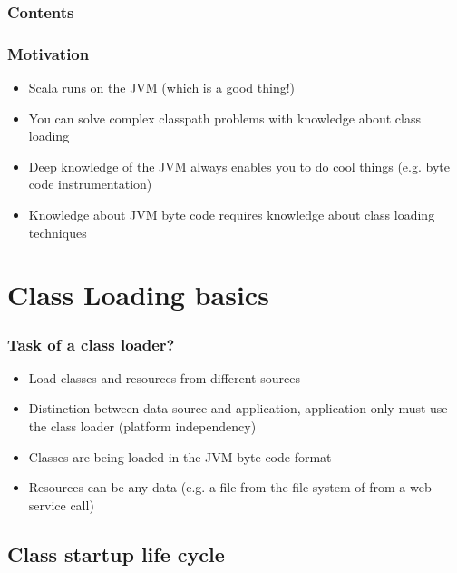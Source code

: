 \documentclass[aspectratio=169]{beamer}
\begin{document}
\begin{frame}
	\frametitle{Contents}
	\tableofcontents
\end{frame}

\begin{frame}
	\frametitle{Motivation}
	\begin{itemize}
		\item{Scala runs on the JVM (which is a good thing!)}
		\item{You can solve complex classpath problems with knowledge about class loading}
		\item{Deep knowledge of the JVM always enables you to do cool things (e.g. byte code instrumentation)}
		\item{Knowledge about JVM byte code requires knowledge about class loading techniques}
	\end{itemize}
\end{frame}

\section{Class Loading basics}

\begin{frame}
	\frametitle{Task of a class loader?}
	\begin{itemize}
		\item{Load classes and resources from different sources}
		\item{Distinction between data source and application, application only must use the class loader (platform independency)}
		\item{Classes are being loaded in the JVM byte code format}
		\item{Resources can be any data (e.g. a file from the file system of from a web service call)}
	\end{itemize}
\end{frame}

\subsection{Class startup life cycle}
\end{document}
